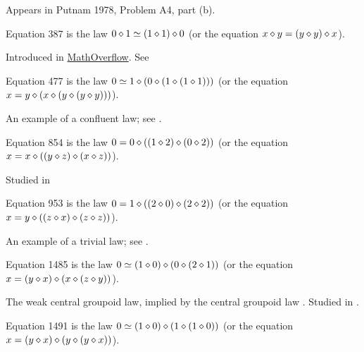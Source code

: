 Appears in Putnam 1978, Problem A4, part (b).

\begin{definition}[Equation 387]\label{eq387}\leanok{}  Equation 387 is the law $0 \diamond 1  \simeq  (1 \diamond 1) \diamond 0$ (or the equation $x \diamond y = (y \diamond y) \diamond x$).
\end{definition}

Introduced in \href{https://mathoverflow.net/a/450905/766}{MathOverflow}. See 

\begin{definition}[Equation 477]\label{eq477}\leanok{}  Equation 477 is the law $0 \simeq 1 \diamond (0 \diamond (1 \diamond (1 \diamond 1)))$ (or the equation $x = y \diamond (x \diamond (y \diamond (y \diamond y)))$).
\end{definition}

An example of a confluent law; see .

\begin{definition}[Equation 854]\label{eq854}\leanok{}  Equation 854 is the law $0 = 0 \diamond ((1 \diamond 2) \diamond (0 \diamond 2))$ (or the equation $x = x \diamond ((y \diamond z) \diamond (x \diamond z))$).
\end{definition}

Studied in 


\begin{definition}[Equation 953]\label{eq953}\leanok{}  Equation 953 is the law $0 = 1 \diamond ((2 \diamond 0) \diamond (2 \diamond 2))$ (or the equation $x = y \diamond ((z \diamond x) \diamond (z \diamond z))$).
\end{definition}

An example of a trivial law; see .

\begin{definition}[Equation 1485]\label{eq1485}\leanok{}  Equation 1485 is the law $0 \simeq  (1 \diamond 0) \diamond (0 \diamond (2 \diamond 1))$ (or the equation $x = (y \diamond x) \diamond (x \diamond (z \diamond y))$).
\end{definition}

The weak central groupoid law, implied by the central groupoid law . Studied in .

\begin{definition}[Equation 1491]\label{eq1491}\leanok{}  Equation 1491 is the law $0 \simeq  (1 \diamond 0) \diamond (1 \diamond (1 \diamond 0))$ (or the equation $x = (y \diamond x) \diamond (y \diamond (y \diamond x))$).
\end{definition}

